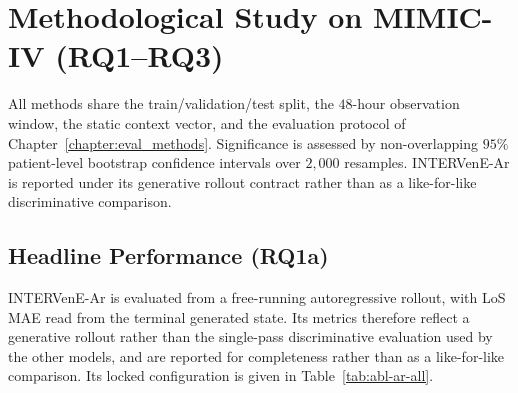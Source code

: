 \section{Methodological Study on MIMIC-IV (RQ1--RQ3)}
\label{sec:results-mimic}
\label{sec:eval-methodological}

All methods share the train/validation/test split, the $48$-hour observation window, the static context vector, and the evaluation protocol of Chapter~\ref{chapter:eval_methods}. Significance is assessed by non-overlapping $95\%$ patient-level bootstrap confidence intervals over $2{,}000$ resamples. INTERVenE-Ar is reported under its generative rollout contract rather than as a like-for-like discriminative comparison.

\subsection{Headline Performance (RQ1a)}

\begin{table}[htbp]
  \caption{Patient-level performance on the MIMIC-IV diabetic cohort, support-weighted across the six outcomes. AUPRC$_w$ is the primary metric; AUROC$_w$ and F1$_w$ summarize discrimination; LoS is length-of-stay MAE in hours. Parameter counts are for the deployed models; for KarmaLego the budget is the number of selected sparse TIRP features. Bold marks the best result in each column.}
  \label{tab:headline}
  \centering
\singlespacing
  \small

  \smallskip
  \footnotesize INTERVenE-Ar is evaluated from a free-running autoregressive rollout, with LoS MAE read from the terminal generated state. Its metrics therefore reflect a generative rollout rather than the single-pass discriminative evaluation used by the other models, and are reported for completeness rather than as a like-for-like comparison. Its locked configuration is given in Table~\ref{tab:abl-ar-all}.
\end{table}

